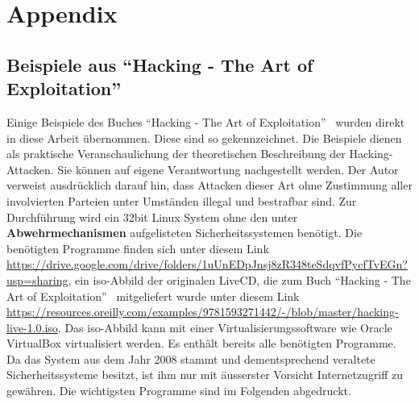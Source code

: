 \documentclass[11pt, a4paper]{article}
\begin{document}
\appendix
\newpage
\renewcommand{\thesubsection}{\Alph{subsection}}
\pagebreak

\section{Appendix}
\subsection{Beispiele aus ``Hacking - The Art of Exploitation''}\label{subsec:beispiele}
Einige Beispiele des Buches ``Hacking - The Art of Exploitation''~\cite{erickson2008hacking} wurden direkt in diese Arbeit übernommen. Diese sind so gekennzeichnet. Die Beispiele dienen als praktische Veranschaulichung der theoretischen Beschreibung der Hacking-Attacken. Sie können auf eigene Verantwortung nachgestellt werden. Der Autor verweist ausdrücklich darauf hin, dass Attacken dieser Art ohne Zustimmung aller involvierten Parteien unter Umständen illegal und bestrafbar sind. Zur Durchführung wird ein 32bit Linux System ohne den unter \textbf{Abwehrmechanismen} aufgelisteten Sicherheitssystemen benötigt. Die benötigten Programme finden sich unter diesem Link \url{https://drive.google.com/drive/folders/1uUnEDpJnsj8zR348teSdqvfPycfTvEGn?usp=sharing}, ein \gls{iso}-Abbild der originalen LiveCD, die zum Buch ``Hacking - The Art of Exploitation''~\cite{erickson2008hacking} mitgeliefert wurde unter diesem Link \url{https://resources.oreilly.com/examples/9781593271442/-/blob/master/hacking-live-1.0.iso}. Das \gls{iso}-Abbild kann mit einer Virtualisierungssoftware wie Oracle VirtualBox virtualisiert werden. Es enthält bereits alle benötigten Programme. Da das System aus dem Jahr 2008 stammt und dementsprechend veraltete Sicherheitssysteme besitzt, ist ihm nur mit äusserster Vorsicht Internetzugriff zu gewähren. Die wichtigsten Programme sind im Folgenden abgedruckt.
\end{document}
